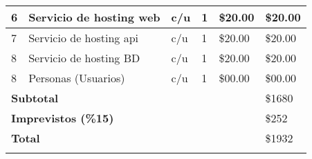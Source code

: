 \begin{ThreePartTable}
\begin{longtable}{|l |p{}| l| l| p{}| p{}|}
		6                                                 & Servicio de hosting web            & c/u             & 1                 & \$20.00                 & \$20.00              \\\hline
		7                                                 & Servicio de hosting api            & c/u             & 1                 & \$20.00                 & \$20.00              \\\hline
		8                                                 & Servicio de hosting BD             & c/u             & 1                 & \$20.00                 & \$20.00              \\\hline
		8                                                 & Personas (Usuarios)                & c/u             & 1                 & \$00.00                 & \$00.00              \\
		\hline
		\multicolumn{5}{|l|}{\textbf{Subtotal}}           & \$1680                                                                                                                    \\
		\multicolumn{5}{|l|}{\textbf{Imprevistos (\%15)}} & \$252                                                                                                                     \\
		\multicolumn{5}{|l|}{\textbf{Total}}              & \$1932                                                                                                                    \\
		\hline
		\insertTableNotes
	\end{longtable}
\end{ThreePartTable}